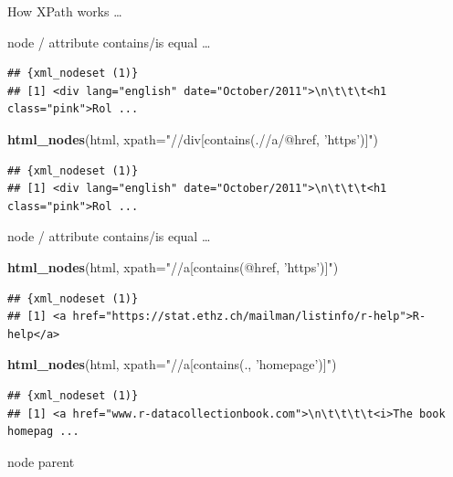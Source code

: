\documentclass[ignorenonframetext,]{beamer}
\newenvironment{Shaded}{\begin{snugshade}}{\end{snugshade}}
\newcommand{\KeywordTok}[1]{\textcolor[rgb]{0.13,0.29,0.53}{\textbf{{#1}}}}
\newcommand{\DataTypeTok}[1]{\textcolor[rgb]{0.13,0.29,0.53}{{#1}}}
\newcommand{\StringTok}[1]{\textcolor[rgb]{0.31,0.60,0.02}{{#1}}}
\newcommand{\NormalTok}[1]{{#1}}
\begin{document}
\begin{frame}[fragile]{How XPath works \ldots{}}
\begin{block}{node / attribute contains/is equal \ldots{}}
\begin{verbatim}
## {xml_nodeset (1)}
## [1] <div lang="english" date="October/2011">\n\t\t\t<h1 class="pink">Rol ...
\end{verbatim}

\begin{Shaded}
\begin{Highlighting}[]
\KeywordTok{html_nodes}\NormalTok{(html, }\DataTypeTok{xpath=}\StringTok{"//div[contains(.//a/@href, 'https')]"}\NormalTok{)}
\end{Highlighting}
\end{Shaded}

\begin{verbatim}
## {xml_nodeset (1)}
## [1] <div lang="english" date="October/2011">\n\t\t\t<h1 class="pink">Rol ...
\end{verbatim}

\end{block}

\begin{block}{node / attribute contains/is equal \ldots{}}

\begin{Shaded}
\begin{Highlighting}[]
\KeywordTok{html_nodes}\NormalTok{(html, }\DataTypeTok{xpath=}\StringTok{"//a[contains(@href, 'https')]"}\NormalTok{)}
\end{Highlighting}
\end{Shaded}

\begin{verbatim}
## {xml_nodeset (1)}
## [1] <a href="https://stat.ethz.ch/mailman/listinfo/r-help">R-help</a>
\end{verbatim}

\begin{Shaded}
\begin{Highlighting}[]
\KeywordTok{html_nodes}\NormalTok{(html, }\DataTypeTok{xpath=}\StringTok{"//a[contains(., 'homepage')]"}\NormalTok{)}
\end{Highlighting}
\end{Shaded}

\begin{verbatim}
## {xml_nodeset (1)}
## [1] <a href="www.r-datacollectionbook.com">\n\t\t\t\t<i>The book homepag ...
\end{verbatim}

\end{block}

\begin{block}{node parent}


\end{block}
\end{frame}
\end{document}
